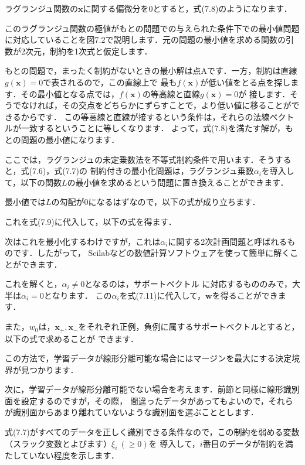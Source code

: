 ラグランジュ関数の$\bm{x}$に関する偏微分を0とすると，式(7.8)のようになります．


このラグランジュ関数の極値がもとの問題での与えられた条件下での最小値問題に対応していることを図7.2で説明します．元の問題の最小値を求める関数の引数が2次元，制約を1次式と仮定します．

もとの問題で，まったく制約がないときの最小解は点Aです．一方，制約は直線$g(\bm{x})=0$で表されるので，この直線上で
最も$f(\bm{x})$が低い値をとる点を探します．その最小値となる点では，$f(\bm{x})$の等高線と直線$g(\bm{x})=0$が
接します．そうでなければ，その交点をどちらかにずらすことで，より低い値に移ることができるからです．
この等高線と直線が接するという条件は，それらの法線ベクトルが一致するということに等しくなります．
よって，式(7.8)を満たす解が，もとの問題の最小値になります．


ここでは，ラグランジュの未定乗数法を不等式制約条件で用います．そうすると，式(7.6)，式(7.7)の
制約付きの最小化問題は，ラグランジュ乗数$\alpha_i$を導入して，以下の関数$L$の最小値を求めるという問題に置き換えることができます．


最小値では$L$の勾配が0になるはずなので，以下の式が成り立ちます．

これを式(7.9)に代入して，以下の式を得ます．

次はこれを最小化するわけですが，これは$\alpha_i$に関する2次計画問題と呼ばれるものです．したがって，
Scilabなどの数値計算ソフトウェアを使って簡単に解くことができます．

これを解くと，$\alpha_i \neq 0$となるのは，サポートベクトル
に対応するもののみで，大半は$\alpha_i = 0$となります．
この$\alpha_i$を式(7.11)に代入して，$\bm{w}$を得ることができます．


また，$w_0$は，$\bm{x}_{+}, \bm{x}_{-}$をそれぞれ正例，負例に属するサポートベクトルとすると，以下の式で求めることが
できます．

この方法で，学習データが線形分離可能な場合にはマージンを最大にする決定境界が見つかります．


次に，学習データが線形分離可能でない場合を考えます．前節と同様に線形識別面を設定するのですが，その際，
間違ったデータがあってもよいので，それらが識別面からあまり離れていないような識別面を選ぶこととします．


式(7.7)がすべてのデータを正しく識別できる条件なので，この制約を弱める変数（スラック変数とよびます）$\xi_i ~ (\ge 0)$を
導入して，$i$番目のデータが制約を満たしていない程度を示します．

